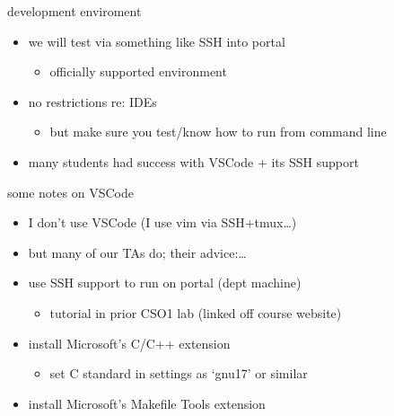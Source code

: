 \begin{frame}{development enviroment}
    \begin{itemize}
    \item we will test via something like SSH into portal
	\begin{itemize}
	\item officially supported environment
	\end{itemize}
    \vspace{.5cm}
    \item no restrictions re: IDEs
	\begin{itemize}
	\item but make sure you test/know how to run from command line
	\end{itemize}
    \item many students had success with VSCode + its SSH support
    \end{itemize}
\end{frame}

\begin{frame}{some notes on VSCode}
    \begin{itemize}
    \item I don't use VSCode (I use vim via SSH+tmux\ldots) 
    \item but many of our TAs do; their advice:\ldots
    \vspace{.5cm}
    \item use SSH support to run on portal (dept machine)
        \begin{itemize}
            \item tutorial in prior CSO1 lab (linked off course website)
        \end{itemize}
    \item install Microsoft's C/C++ extension
        \begin{itemize}
        \item set C standard in settings as `gnu17' or similar
        \end{itemize}
    \item install Microsoft's Makefile Tools extension
    \end{itemize}
\end{frame}
